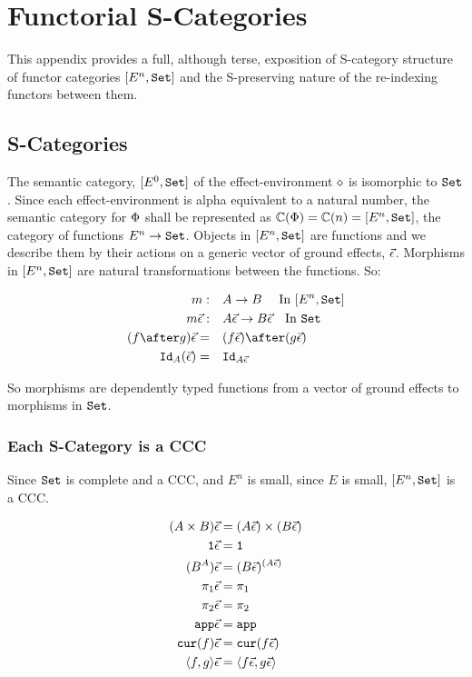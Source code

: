 
    \chapter{Functorial S-Categories}
    This appendix provides a full, although terse, exposition of S-category structure of functor categories $[E^n, \set]$ and the S-preserving nature of the re-indexing functors between them.
    
    \section{S-Categories}
    The semantic category, $[E^0, \set]$ of the effect-environment $\nil$ is isomorphic to $\set$. Since each effect-environment is alpha equivalent to a natural number, the semantic category for $\P$ shall be represented as $\C(\P) = \C(n) = [E^n, \set]$, the category of functions $E^n\rightarrow \set$. Objects in $[E^n, \set]$ are functions and we describe them by their actions on a generic vector of ground effects, $\ev$. Morphisms in $[E^n, \set]$ are natural transformations between the functions. So:
    
    \begin{align*}
        m:\quad&A \rightarrow B \qt{ In $[E^n, \set]$}\\
        m\ev:\quad& A\ev \rightarrow B\ev \qt{In $\set$}\\
        (f\after g)\ev =\quad& (f\ev)\after(g\ev)\\
        \Id{A}(\ev) =\quad& \Id{A\ev}
    \end{align*}
    
    So morphisms are dependently typed functions from a vector of ground effects to morphisms in $\set$.
    \subsection{Each S-Category is a CCC}
    Since $\set$ is complete and a CCC, and $E^n$ is small, since $E$ is small, $[E^n, \set]$ is a CCC.
    
    \begin{align*}
        (A\times B)\ev & = (A\ev)\times(B\ev)\\
        \1\ev & = \1\\
        (B^A)\ev &= (B\ev)^{(A\ev)}\\
        \p\ev & = \p\\
        \pp\ev & = \pp\\
        \app\ev & = \app\\
        \cur{f}\ev & = \cur{f\ev}\\
        \pr{f}{g}\ev & = \pr{f\ev}{g\ev}\\
    \end{align*}
    
